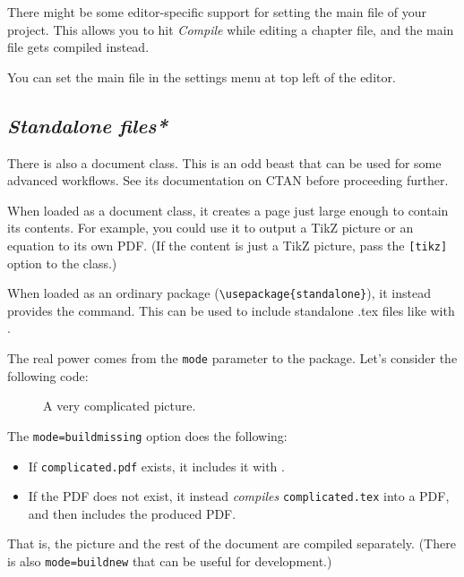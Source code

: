 There might be some editor-specific support for setting the main file of your project.
This allows you to hit \emph{Compile} while editing a chapter file,
and the main file gets compiled instead.

\begin{overleaf}
You can set the main file in the settings menu at top left of the editor.
\end{overleaf}


\subsection{\emph{Standalone files*}}

There is also a  document class.
This is an odd beast that can be used for some advanced workflows.
See its documentation on CTAN before proceeding further.

When loaded as a document class,
it creates a page just large enough to contain its contents.
For example, you could use it to output a TikZ picture or an equation to its own PDF.
(If the content is just a TikZ picture, pass the \verb|[tikz]| option to the class.)

When loaded as an ordinary package (\verb|\usepackage{standalone}|),
it instead provides the  command.
This can be used to include standalone .tex files like with .

The real power comes from the \verb|mode| parameter to the package.
Let's consider the following code:
%
\begin{ExampleCode}
\usepackage[mode=buildmissing]{standalone}

\begin{figure}

\caption{A very complicated picture.}
\end{figure}
\end{ExampleCode}
%
The \verb|mode=buildmissing| option does the following:
\begin{itemize}
    \item If \verb|complicated.pdf| exists,
        it includes it with .
    \item If the PDF does not exist,
        it instead \emph{compiles} \verb|complicated.tex| into a PDF,
        and then includes the produced PDF.
\end{itemize}
%
That is, the picture and the rest of the document are compiled separately.
(There is also \verb|mode=buildnew| that can be useful for development.)

